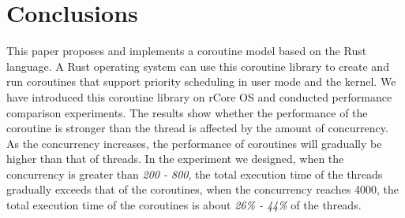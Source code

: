 \documentclass[10pt]{article}
\begin{document}
\section{Conclusions}

This paper proposes and implements a coroutine model based on the Rust language. A Rust operating system can use this coroutine library to create and run coroutines that support priority scheduling in user mode and the kernel. We have introduced this coroutine library on rCore OS and conducted performance comparison experiments. The results show whether the performance of the coroutine is stronger than the thread is affected by the amount of concurrency. As the concurrency increases, the performance of coroutines will gradually be higher than that of threads. In the experiment we designed, when the concurrency is greater than \textit{200 - 800}, the total execution time of the threads gradually exceeds that of the coroutines, when the concurrency reaches 4000, the total execution time of the coroutines is about \textit{26\% - 44\%} of the threads.


\makeatletter
\def\url@leostyle{%
  \@ifundefined{selectfont}{\def\UrlFont{\sf}}{\def\UrlFont{\small\ttfamily}}}
\makeatother



\end{document}
